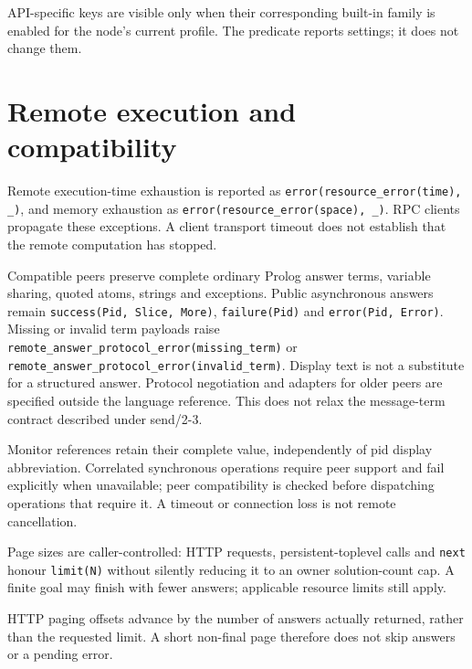 \noindent API-specific keys are visible only when their corresponding
built-in family is enabled for the node's current profile. The predicate
reports settings; it does not change them.\par

\section{Remote execution and compatibility}\label{sec:manual-remote-compatibility}
Remote execution-time exhaustion is reported as \texttt{error(\allowbreak{}resource\_\allowbreak{}error(\allowbreak{}time),\allowbreak{} \_\allowbreak{})}, and
memory exhaustion as \texttt{error(\allowbreak{}resource\_\allowbreak{}error(\allowbreak{}space),\allowbreak{} \_\allowbreak{})}. RPC clients propagate these
exceptions. A client transport timeout does not establish that the remote computation has stopped.

Compatible peers preserve complete ordinary Prolog answer terms, variable
sharing, quoted atoms, strings and exceptions. Public asynchronous answers
remain \texttt{success(Pid, Slice, More)}, \texttt{failure(Pid)} and
\texttt{error(Pid, Error)}. Missing or invalid term payloads raise
\texttt{remote\_\allowbreak{}answer\_\allowbreak{}protocol\_\allowbreak{}error(\allowbreak{}missing\_\allowbreak{}term)} or
\texttt{remote\_\allowbreak{}answer\_\allowbreak{}protocol\_\allowbreak{}error(\allowbreak{}invalid\_\allowbreak{}term)}. Display text is not
a substitute for a structured answer. Protocol negotiation and adapters for
older peers are specified outside the language reference. This does not relax
the message-term contract described under send/2-3.

Monitor references retain their complete value, independently of pid display abbreviation.
Correlated synchronous operations require peer support and fail explicitly when unavailable;
peer compatibility is checked before dispatching operations that require it. A timeout or connection loss is not
remote cancellation.

Page sizes are caller-controlled: HTTP requests, persistent-toplevel calls and
\texttt{next} honour \texttt{limit(N)} without silently reducing it to an owner solution-count cap.
A finite goal may finish with fewer answers; applicable resource limits still apply.

HTTP paging offsets advance by the number of answers actually returned, rather than the requested
limit. A short non-final page therefore does not skip answers or a pending error.

